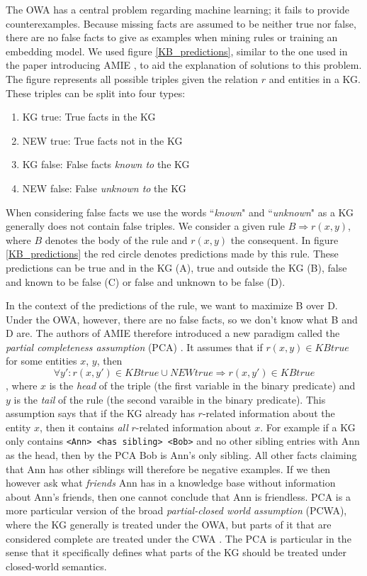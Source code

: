 The OWA has a central problem regarding machine learning; it fails to provide counterexamples. Because missing facts are assumed to be neither true nor false, there are no false facts to give as examples when mining rules or training an embedding model. We used figure \ref{KB_predictions}, similar to the one used in the paper introducing AMIE \cite{amie}, to aid the explanation of solutions to this problem. The figure represents all possible triples given the relation $r$ and entities in a KG. These triples can be split into four types:
\begin{enumerate}
    \item KG true: True facts in the KG
    \item NEW true: True facts not in the KG
    \item KG false: False facts \textit{known to} the KG
    \item NEW false: False \textit{unknown to} the KG
\end{enumerate}
When considering false facts we use the words ``\textit{known}" and ``\textit{unknown}" as a KG generally does not contain false triples. We consider a given rule $B \Rightarrow r(x, y)$, where $B$ denotes the body of the rule and $r(x, y)$ the consequent. In figure \ref{KB_predictions} the red circle denotes predictions made by this rule. These predictions can be true and in the KG (A), true and outside the KG (B), false and known to be false (C) or false and unknown to be false (D). 

In the context of the predictions of the rule, we want to maximize B over D. Under the OWA, however, there are no false facts, so we don't know what B and D are. The authors of AMIE therefore introduced a new paradigm called the \textit{partial completeness assumption} (PCA) \cite{amie}. It assumes that if $r(x, y) \in KB true$ for some entities $x$, $y$, then
\[\forall y' : r(x, y') \in KBtrue \cup NEWtrue \Rightarrow r(x, y') \in KBtrue\]
, where $x$ is the \textit{head} of the triple (the first variable in the binary predicate) and $y$ is the \textit{tail} of the rule (the second varaible in the binary predicate).
This assumption says that if the KG already has $r$-related information about the entity $x$,  then it contains \textit{all} $r$-related information about $x$. For example if a KG only contains \texttt{<Ann> <has sibling> <Bob>} and no other sibling entries with Ann as the head, then by the PCA Bob is Ann's only sibling. All other facts claiming that Ann has other siblings will therefore be negative examples. If we then however ask what \textit{friends} Ann has in a knowledge base without information about Ann's friends, then one cannot conclude that Ann is friendless. PCA is a more particular version of the broad \textit{partial-closed world assumption} (PCWA), where the KG generally is treated under the OWA, but parts of it that are considered complete are treated under the CWA \cite{motro1989integrity}. The PCA is particular in the sense that it specifically defines what parts of the KG should be treated under closed-world semantics.

